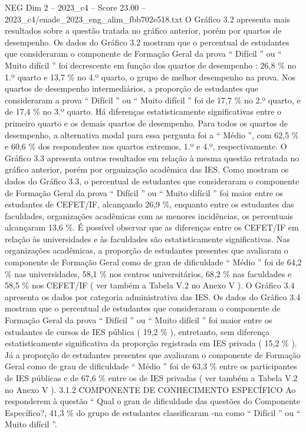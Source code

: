 \begin{textsample}{NEG Dim 2 – 2023\_c4 – Score 23.00 – 2023\_c4/enade\_2023\_eng\_alim\_fbb702e518.txt}
O Gráfico 3.2 apresenta mais resultados sobre a questão tratada no gráfico anterior, porém por quartos de desempenho.
Os dados do Gráfico 3.2 mostram que o percentual de estudantes que consideraram o componente de Formação Geral da prova “ Difícil ” ou “ Muito difícil ” foi decrescente em função dos quartos de desempenho : 26,8 \% no 1.º quarto e 13,7 \% no 4.º quarto, o grupo de melhor desempenho na prova.
Nos quartos de desempenho intermediários, a proporção de estudantes que consideraram a prova “ Difícil ” ou “ Muito difícil ” foi de 17,7 \% no 2.º quarto, e de 17,4 \% no 3.º quarto.
Há diferenças estatisticamente significativas entre o primeiro quarto e os demais quartos de desempenho.
Para todos os quartos de desempenho, a alternativa modal para essa pergunta foi a “ Médio ”, com 62,5 \% e 60,6 \% dos respondentes nos quartos extremos, 1.º e 4.º, respectivamente.
O Gráfico 3.3 apresenta outros resultados em relação à mesma questão retratada no gráfico anterior, porém por organização acadêmica das IES.
Como mostram os dados do Gráfico 3.3, o percentual de estudantes que consideraram o componente de Formação Geral da prova “ Difícil ” ou “ Muito difícil ” foi maior entre os estudantes de CEFET/IF, alcançando 26,9 \%, enquanto entre os estudantes das faculdades, organizações acadêmicas com as menores incidências, os percentuais alcançaram 13,6 \%.
É possível observar que as diferenças entre os CEFET/IF em relação às universidades e às faculdades são estatisticamente significativas.
Nas organizações acadêmicas, a proporção de estudantes presentes que avaliaram o componente de Formação Geral como de grau de dificuldade “ Médio ” foi de 64,2 \% nas universidades, 58,1 \% nos centros universitários, 68,2 \% nas faculdades e 58,5 \% nos CEFET/IF ( ver também a Tabela V.2 no Anexo V ).
O Gráfico 3.4 apresenta os dados por categoria administrativa das IES.
Os dados do Gráfico 3.4 mostram que o percentual de estudantes que consideraram o componente de Formação Geral da prova “ Difícil ” ou “ Muito difícil ” foi maior entre os estudantes de cursos de IES pública ( 19,2 \% ), entretanto, sem diferença estatisticamente significativa da proporção registrada em IES privada ( 15,2 \% ).
Já a proporção de estudantes presentes que avaliaram o componente de Formação Geral como de grau de dificuldade “ Médio ” foi de 63,3 \% entre os participantes de IES públicas e de 67,6 \% entre os de IES privadas ( ver também a Tabela V.2 no Anexo V ). 3.1.2 COMPONENTE DE CONHECIMENTO ESPECÍFICO Ao responderem à questão “ Qual o grau de dificuldade das questões do Componente Específico?, 41,3 \% do grupo de estudantes classificaram -na como “ Difícil ” ou “ Muito difícil ”.

\end{textsample}
